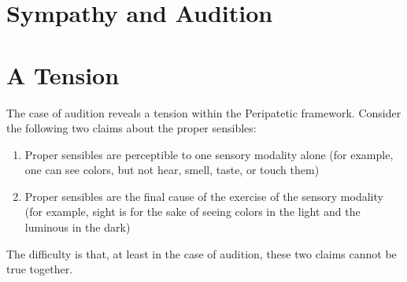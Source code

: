 
\section{Sympathy and Audition} %
\label{sec:sympathy_and_audition}


\section{A Tension} %
\label{sec:a_tension}

The case of audition reveals a tension within the Peripatetic framework. Consider the following two claims about the proper sensibles:
\begin{enumerate}[(1)]
	\item Proper sensibles are perceptible to one sensory modality alone (for example, one can see colors, but not hear, smell, taste, or touch them)
	\item Proper sensibles are the final cause of the exercise of the sensory modality (for example, sight is for the sake of seeing colors in the light and the luminous in the dark)
\end{enumerate}
The difficulty is that, at least in the case of audition, these two claims cannot be true together.

